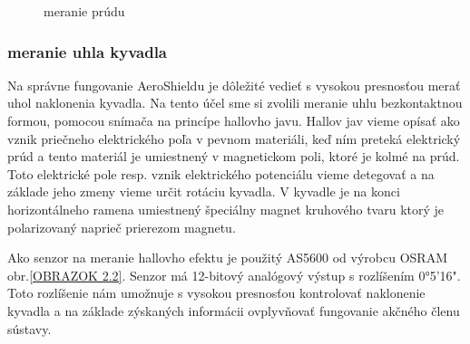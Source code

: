 \begin{figure}
\hfill
{}
\hfill
{}
\hfill
\caption{meranie prúdu}\label{OBRAZOK 2.3}
\end{figure}


\label{Hall}
\subsubsection{meranie uhla kyvadla}

Na správne fungovanie AeroShieldu je dôležité vedieť s vysokou presnosťou merať uhol naklonenia kyvadla. Na tento účel sme si zvolili meranie uhlu bezkontaktnou formou, pomocou snímača na princípe hallovho javu. Hallov jav vieme opísať ako vznik priečneho elektrického poľa v pevnom materiáli, keď ním preteká elektrický prúd a tento materiál je umiestnený v magnetickom poli, ktoré je kolmé na prúd\cite{Hall}. Toto elektrické pole resp. vznik elektrického potenciálu vieme detegovať a na základe jeho zmeny vieme určit rotáciu kyvadla. V kyvadle je na konci horizontálneho ramena umiestnený špeciálny magnet kruhového tvaru ktorý je polarizovaný naprieč prierezom magnetu.

Ako senzor na meranie hallovho efektu je použitý AS5600 od výrobcu OSRAM obr.\ref{OBRAZOK 2.2}. Senzor má 12-bitový analógový výstup s rozlíšením 0°5'16". Toto rozlíšenie nám umožnuje s vysokou presnosťou kontrolovať naklonenie kyvadla a na základe zýskaných informácii ovplyvňovať fungovanie akčného členu sústavy. 

